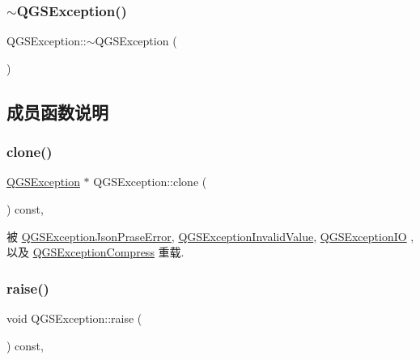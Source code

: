 \subsubsection{\texorpdfstring{$\sim$\+Q\+G\+S\+Exception()}{~QGSException()}}
{\footnotesize\ttfamily Q\+G\+S\+Exception\+::$\sim$\+Q\+G\+S\+Exception (\begin{DoxyParamCaption}{ }\end{DoxyParamCaption})\hspace{0.3cm}{\ttfamily [virtual]}}



\subsection{成员函数说明}
\mbox{\label{class_q_g_s_exception_a5b4e0c020491f88d8ed6644f1e25e082}} 
\subsubsection{\texorpdfstring{clone()}{clone()}}
{\footnotesize\ttfamily \mbox{\hyperlink{class_q_g_s_exception}{Q\+G\+S\+Exception}} $\ast$ Q\+G\+S\+Exception\+::clone (\begin{DoxyParamCaption}{ }\end{DoxyParamCaption}) const\hspace{0.3cm}{\ttfamily [override]}, {\ttfamily [virtual]}}



被 \mbox{\hyperlink{class_q_g_s_exception_json_prase_error_a299d1b5dff92fda50864d5b6de676678}{Q\+G\+S\+Exception\+Json\+Prase\+Error}}, \mbox{\hyperlink{class_q_g_s_exception_invalid_value_a93d1a2fa41fb57aa9d68048497b5e16c}{Q\+G\+S\+Exception\+Invalid\+Value}}, \mbox{\hyperlink{class_q_g_s_exception_i_o_a7dd3336405c38be4cdd093e173ba24f0}{Q\+G\+S\+Exception\+IO}} , 以及 \mbox{\hyperlink{class_q_g_s_exception_compress_a412b0b6d21a29dccc82b5672fe8f97d8}{Q\+G\+S\+Exception\+Compress}} 重载.

\mbox{\label{class_q_g_s_exception_a78e6d3c9f92bbc94440d4c2e946beed2}} 
\subsubsection{\texorpdfstring{raise()}{raise()}}
{\footnotesize\ttfamily void Q\+G\+S\+Exception\+::raise (\begin{DoxyParamCaption}{ }\end{DoxyParamCaption}) const\hspace{0.3cm}{\ttfamily [override]}, {\ttfamily [virtual]}}



